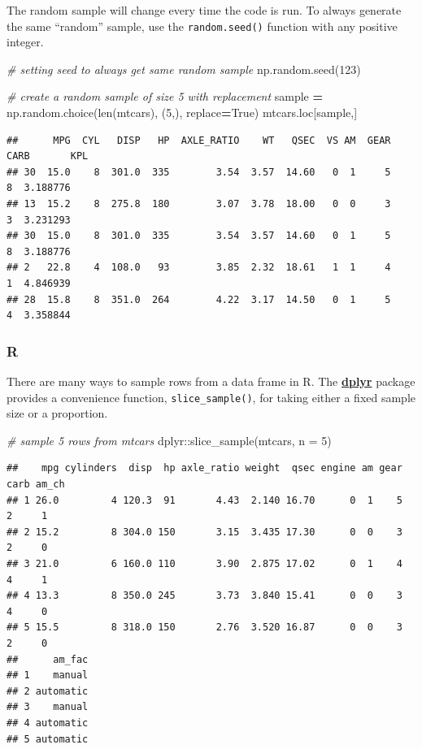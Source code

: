 \documentclass[
]{book}
\newenvironment{Shaded}{\begin{snugshade}}{\end{snugshade}}
\newcommand{\AttributeTok}[1]{\textcolor[rgb]{0.77,0.63,0.00}{#1}}
\newcommand{\BuiltInTok}[1]{#1}
\newcommand{\CommentTok}[1]{\textcolor[rgb]{0.56,0.35,0.01}{\textit{#1}}}
\newcommand{\DecValTok}[1]{\textcolor[rgb]{0.00,0.00,0.81}{#1}}
\newcommand{\FunctionTok}[1]{\textcolor[rgb]{0.00,0.00,0.00}{#1}}
\newcommand{\NormalTok}[1]{#1}
\newcommand{\OperatorTok}[1]{\textcolor[rgb]{0.81,0.36,0.00}{\textbf{#1}}}
\newcommand{\SpecialCharTok}[1]{\textcolor[rgb]{0.00,0.00,0.00}{#1}}
\newcommand{\VariableTok}[1]{\textcolor[rgb]{0.00,0.00,0.00}{#1}}
\begin{document}
The random sample will change every time the code is run. To always generate the same ``random'' sample, use the \texttt{random.seed()} function with any positive integer.

\begin{Shaded}
\begin{Highlighting}[]
\CommentTok{\# setting seed to always get same random sample}
\NormalTok{np.random.seed(}\DecValTok{123}\NormalTok{)}

\CommentTok{\# create a random sample of size 5 with replacement}
\NormalTok{sample }\OperatorTok{=}\NormalTok{ np.random.choice(}\BuiltInTok{len}\NormalTok{(mtcars), (}\DecValTok{5}\NormalTok{,), replace}\OperatorTok{=}\VariableTok{True}\NormalTok{)}
\NormalTok{mtcars.loc[sample,]}
\end{Highlighting}
\end{Shaded}

\begin{verbatim}
##      MPG  CYL   DISP   HP  AXLE_RATIO    WT   QSEC  VS AM  GEAR  CARB       KPL
## 30  15.0    8  301.0  335        3.54  3.57  14.60   0  1     5     8  3.188776
## 13  15.2    8  275.8  180        3.07  3.78  18.00   0  0     3     3  3.231293
## 30  15.0    8  301.0  335        3.54  3.57  14.60   0  1     5     8  3.188776
## 2   22.8    4  108.0   93        3.85  2.32  18.61   1  1     4     1  4.846939
## 28  15.8    8  351.0  264        4.22  3.17  14.50   0  1     5     4  3.358844
\end{verbatim}

\hypertarget{r-29}{%
\subsubsection*{R}\label{r-29}}

There are many ways to sample rows from a data frame in R. The \href{https://dplyr.tidyverse.org/}{\textbf{dplyr}} package provides a convenience function, \texttt{slice\_sample()}, for taking either a fixed sample size or a proportion.

\begin{Shaded}
\begin{Highlighting}[]
\CommentTok{\# sample 5 rows from mtcars}
\NormalTok{dplyr}\SpecialCharTok{::}\FunctionTok{slice\_sample}\NormalTok{(mtcars, }\AttributeTok{n =} \DecValTok{5}\NormalTok{)}
\end{Highlighting}
\end{Shaded}

\begin{verbatim}
##    mpg cylinders  disp  hp axle_ratio weight  qsec engine am gear carb am_ch
## 1 26.0         4 120.3  91       4.43  2.140 16.70      0  1    5    2     1
## 2 15.2         8 304.0 150       3.15  3.435 17.30      0  0    3    2     0
## 3 21.0         6 160.0 110       3.90  2.875 17.02      0  1    4    4     1
## 4 13.3         8 350.0 245       3.73  3.840 15.41      0  0    3    4     0
## 5 15.5         8 318.0 150       2.76  3.520 16.87      0  0    3    2     0
##      am_fac
## 1    manual
## 2 automatic
## 3    manual
## 4 automatic
## 5 automatic
\end{verbatim}
\end{document}
